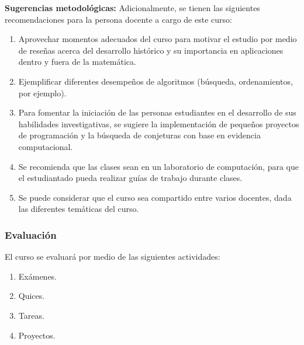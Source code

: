 \begin{refsection}
\textbf{Sugerencias metodológicas:} Adicionalmente, se tienen las siguientes recomendaciones para la persona docente a cargo de este curso:
\begin{enumerate}
    \item Aprovechar momentos adecuados del curso para motivar el estudio por medio de reseñas acerca del desarrollo histórico  y su importancia en aplicaciones dentro y fuera de la matemática.
    \item Ejemplificar diferentes desempeños de algoritmos (búsqueda, ordenamientos, por ejemplo).
    \item Para fomentar la iniciación de las personas estudiantes en el desarrollo de sus habilidades investigativas, se sugiere la implementación de pequeños proyectos de programación y la búsqueda de conjeturas con base en evidencia computacional.%
    \item Se recomienda que las clases sean en un laboratorio de computación, para que el estudiantado pueda realizar guías de trabajo durante clases.
    \item Se puede considerar que el curso sea compartido entre varios docentes, dada las diferentes temáticas del curso.
\end{enumerate}



\subsubsection*{Evaluación}

El curso se evaluará por medio de las siguientes actividades:

\begin{enumerate}
\item Exámenes.
\item Quices.
\item Tareas.
\item Proyectos.
\end{enumerate}

\nocite{CLR--IntroToAlgorithms} \nocite{GKP--ConcreteMathematics} \nocite{langtangen_primer_2016}
\nocite{CCC22}
\nocite{Fer17}
\nocite{BRR15}

\printcursosbibliography
\end{refsection}
